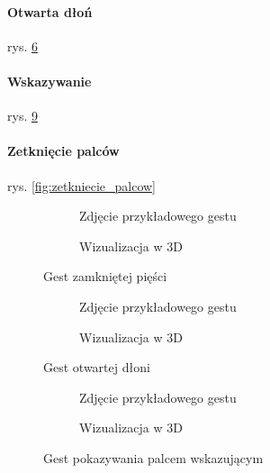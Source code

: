 \documentclass[12pt,a4paper]{article}
\begin{document}
\paragraph{Otwarta dłoń}
rys. \ref{fig:otwarta_dlon}
\paragraph{Wskazywanie}
rys. \ref{fig:wskazywanie}
\paragraph{Zetknięcie palców}
rys. \ref{fig:zetkniecie_palcow}

\begin{figure}[ht!]
\centering
\begin{subfigure}{.5\textwidth}
	\centering
	\caption{Zdjęcie przykładowego gestu}
	\label{fig:piesc_foto}
\end{subfigure}%
\begin{subfigure}{.5\textwidth}
	\centering
	\caption{Wizualizacja w 3D}
	\label{fig:piesc_3D}
\end{subfigure}
\caption{Gest zamkniętej pięści}
\label{fig:piesc}
\end{figure}

\begin{figure}[ht!]
\centering
\begin{subfigure}{.5\textwidth}
	\centering
	\caption{Zdjęcie przykładowego gestu}
	\label{fig:otwarta_dlon_foto}
\end{subfigure}%
\begin{subfigure}{.5\textwidth}
	\centering
	\caption{Wizualizacja w 3D}
	\label{fig:otwarta_dlon_3D}
\end{subfigure}
\caption{Gest otwartej dłoni}
\label{fig:otwarta_dlon}
\end{figure}

\begin{figure}[ht!]
\centering
\begin{subfigure}{.5\textwidth}
	\centering
	\caption{Zdjęcie przykładowego gestu}
	\label{fig:wskazywanie_foto}
\end{subfigure}%
\begin{subfigure}{.5\textwidth}
	\centering
	\caption{Wizualizacja w 3D}
	\label{fig:wskazywanie_3D}
\end{subfigure}
\caption{Gest pokazywania palcem wskazującym}
\label{fig:wskazywanie}
\end{figure}
\end{document}
